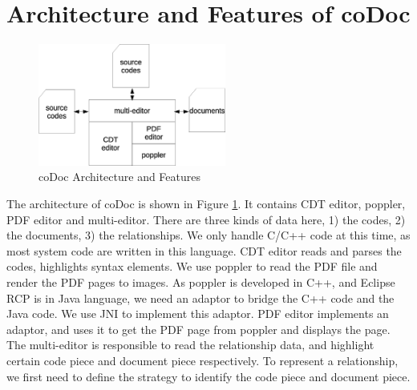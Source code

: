 \documentclass[11pt,letterpaper,oneside]{article}
\begin{document}
\section{Architecture and Features of coDoc}
\label{sec:arch}

\begin{figure}
\begin{center}
\includegraphics[width=0.55\textwidth]{architecture.eps}
\caption{coDoc Architecture and Features}
\label{fig:architecture}
\end{center}
\end{figure}

The architecture of coDoc is shown in Figure \ref{fig:architecture}. 
It contains CDT editor, poppler, PDF editor and multi-editor.
There are three kinds of data here, 1) the codes, 2) the documents, 3) the relationships.
We only handle C/C++ code at this time, 
as most system code are written in this language.
CDT editor reads and parses the codes, 
highlights syntax elements.
We use poppler to read the PDF file and render the PDF pages to images.
As poppler is developed in C++, and Eclipse RCP is in Java language,
we need an adaptor to bridge the C++ code and the Java code.
We use JNI to implement this adaptor.
PDF editor implements an adaptor, 
and uses it to get the PDF page from poppler and displays the page.
The multi-editor is responsible to read the relationship data,
and highlight certain code piece and document piece respectively.
To represent a relationship, 
we first need to define the strategy to identify the code piece and document piece.
\end{document}
